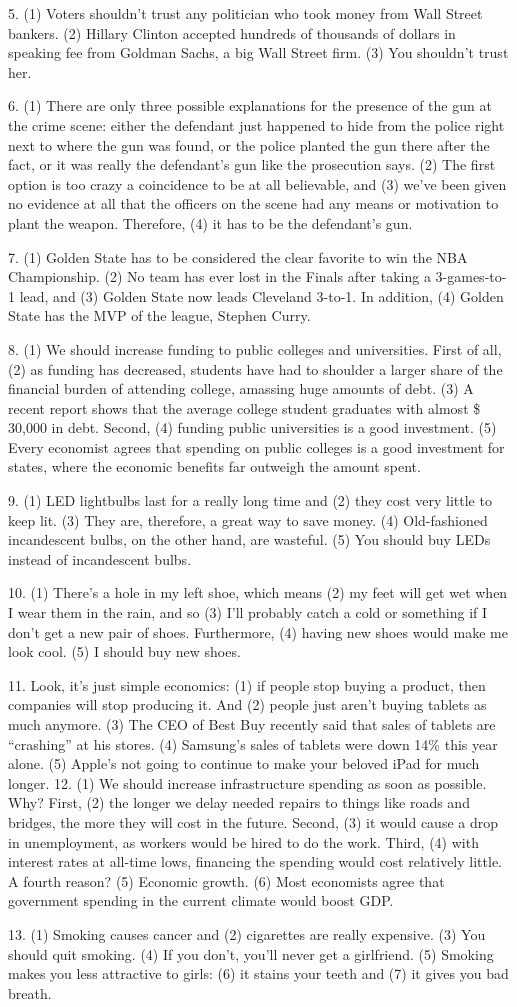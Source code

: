 5. (1) Voters shouldn't trust any politician who took money from Wall Street bankers. (2) Hillary
Clinton accepted hundreds of thousands of dollars in speaking fee from Goldman Sachs, a big
Wall Street firm. (3) You shouldn't trust her.

6. (1) There are only three possible explanations for the presence of the gun at the crime scene:
either the defendant just happened to hide from the police right next to where the gun was found,
or the police planted the gun there after the fact, or it was really the defendant's gun like the
prosecution says. (2) The first option is too crazy a coincidence to be at all believable, and (3) we've
been given no evidence at all that the officers on the scene had any means or motivation to plant
the weapon. Therefore, (4) it has to be the defendant's gun.

7. (1) Golden State has to be considered the clear favorite to win the NBA Championship. (2) No
team has ever lost in the Finals after taking a 3-games-to-1 lead, and (3) Golden State now leads
Cleveland 3-to-1. In addition, (4) Golden State has the MVP of the league, Stephen Curry.

8. (1) We should increase funding to public colleges and universities. First of all, (2) as funding
has decreased, students have had to shoulder a larger share of the financial burden of attending
college, amassing huge amounts of debt. (3) A recent report shows that the average college student
graduates with almost \$ 30,000 in debt. Second, (4) funding public universities is a good
investment. (5) Every economist agrees that spending on public colleges is a good investment for
states, where the economic benefits far outweigh the amount spent.

9. (1) LED lightbulbs last for a really long time and (2) they cost very little to keep lit. (3) They
are, therefore, a great way to save money. (4) Old-fashioned incandescent bulbs, on the other hand,
are wasteful. (5) You should buy LEDs instead of incandescent bulbs.

10. (1) There's a hole in my left shoe, which means (2) my feet will get wet when I wear them in
the rain, and so (3) I'll probably catch a cold or something if I don't get a new pair of shoes.
Furthermore, (4) having new shoes would make me look cool. (5) I should buy new shoes.

11. Look, it's just simple economics: (1) if people stop buying a product, then companies will stop
producing it. And (2) people just aren't buying tablets as much anymore. (3) The CEO of Best Buy
recently said that sales of tablets are ``crashing'' at his stores. (4) Samsung's sales of tablets were
down 14\% 
this year alone. (5) Apple's not going to continue to make your beloved iPad for much
longer.
12. (1) We should increase infrastructure spending as soon as possible. Why? First, (2) the longer
we delay needed repairs to things like roads and bridges, the more they will cost in the future.
Second, (3) it would cause a drop in unemployment, as workers would be hired to do the work.
Third, (4) with interest rates at all-time lows, financing the spending would cost relatively little. A
fourth reason? (5) Economic growth. (6) Most economists agree that government spending in the
current climate would boost GDP.

13. (1) Smoking causes cancer and (2) cigarettes are really expensive. (3) You should quit smoking.
(4) If you don't, you'll never get a girlfriend. (5) Smoking makes you less attractive to girls: (6) it
stains your teeth and (7) it gives you bad breath.

